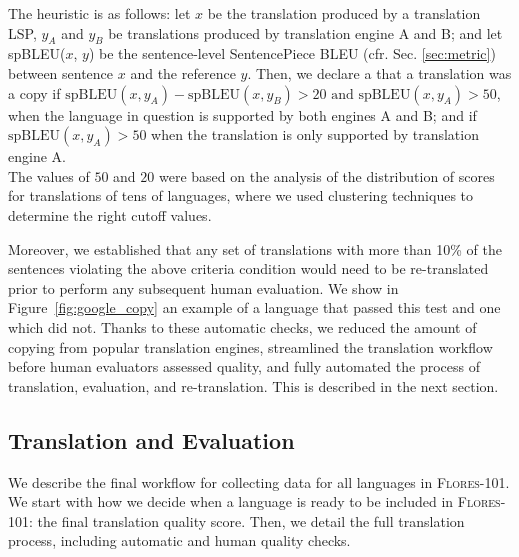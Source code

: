 The heuristic is as follows: let $x$ be the translation produced by a translation LSP, $y_A$ and $y_B$ be translations produced by translation engine A and B; and let spBLEU($x$, $y$) be the sentence-level SentencePiece BLEU (cfr. Sec. \ref{sec:metric}) between sentence $x$ and the reference $y$. Then, we declare a that a translation was a copy if $\mbox{spBLEU}(x, y_A) - \mbox{spBLEU}(x, y_B) > 20 \mbox{ and } \mbox{spBLEU}(x, y_A) > 50$, when the language in question is supported by both engines A and B; and if $\mbox{spBLEU}(x, y_A) > 50$ when the translation is only supported by translation engine A.\\

The values of $50$ and $20$ were based on the analysis of the distribution of scores for translations of tens of languages, where we used clustering techniques to determine the right cutoff values.

Moreover, we established that any set of translations with more than 10\% of the sentences violating the above criteria condition would need to be re-translated prior to perform any subsequent human evaluation. We show in Figure~\ref{fig:google_copy} an example of a language that passed this test and one which did not. Thanks to these automatic checks, we reduced the amount of copying from popular translation engines, streamlined the translation workflow before human evaluators assessed quality, and fully automated the process of translation, evaluation, and re-translation. This is described in the next section.

\subsection{Translation and Evaluation} 
\label{sec:translationeval}

We describe the final workflow for collecting data for all languages in \textsc{Flores-101}. We start with how we decide when a language is ready to be included in \textsc{Flores-101}: the final translation quality score. Then, we detail the full translation process, including automatic and human quality checks.

